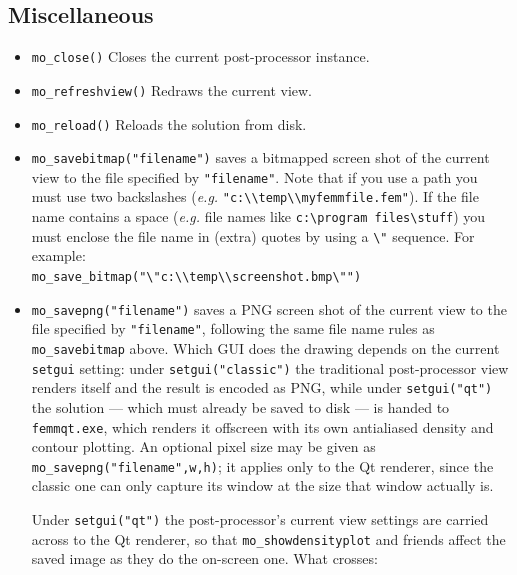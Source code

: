\subsection{Miscellaneous}
\begin{itemize}

\item{\tt mo\_close()} Closes the current post-processor instance.
\item{\tt mo\_refreshview()} Redraws the current view.
\item{\tt mo\_reload()} Reloads the solution from disk.
\item{\tt mo\_savebitmap("filename")} saves a bitmapped screen shot of the current
view to the file specified by {\tt "filename"}. Note that if you
use a path you must use two backslashes ({\em e.g.}
\verb+"c:\\temp\\myfemmfile.fem"+). If the file name contains a space
({\em e.g.} file names like \verb+c:\program files\stuff+) you must
enclose the file name in (extra) quotes by using a
\verb+\"+ sequence. For example:\\
 \verb+mo_save_bitmap("\"c:\\temp\\screenshot.bmp\"")+
\item{\tt mo\_savepng("filename")} saves a PNG screen shot of the current
view to the file specified by {\tt "filename"}, following the same file
name rules as {\tt mo\_savebitmap} above. Which GUI does the drawing
depends on the current {\tt setgui} setting: under {\tt setgui("classic")}
the traditional post-processor view renders itself and the result is
encoded as PNG, while under {\tt setgui("qt")} the solution --- which must
already be saved to disk --- is handed to {\tt femmqt.exe}, which renders
it offscreen with its own antialiased density and contour plotting. An
optional pixel size may be given as {\tt mo\_savepng("filename",w,h)}; it
applies only to the Qt renderer, since the classic one can only capture
its window at the size that window actually is.

Under {\tt setgui("qt")} the post-processor's current view settings are
carried across to the Qt renderer, so that {\tt mo\_showdensityplot} and
friends affect the saved image as they do the on-screen one. What
crosses:


\end{itemize}
